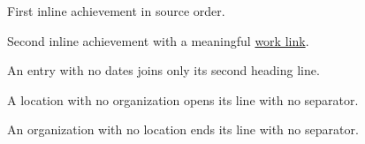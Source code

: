 \documentclass[entrymeta=inline]{careerdossier-resume}
\begin{document}
\MakeCDossierHeader
{}
\begin{CDossierEntry}[
  title={Engineer},
  organization={Example Labs},
  location={Toronto},
  dates={2024--2026}
]
\begin{CDossierItemize}
  \item First inline achievement in source order.
  \item Second inline achievement with a meaningful
        \href{https://example.test/work}{work link}.
\end{CDossierItemize}
\end{CDossierEntry}
\begin{CDossierEntry}[
  title={Dateless Engineer},
  organization={Example Services},
  location={Ottawa}
]
\begin{CDossierItemize}
  \item An entry with no dates joins only its second heading line.
\end{CDossierItemize}
\end{CDossierEntry}
\begin{CDossierEntry}[
  title={Volunteer Reviewer},
  location={Remote}
]
\begin{CDossierItemize}
  \item A location with no organization opens its line with no separator.
\end{CDossierItemize}
\end{CDossierEntry}
\begin{CDossierEntry}[
  title={Workshop Facilitator},
  organization={Example Trust}
]
\begin{CDossierItemize}
  \item An organization with no location ends its line with no separator.
\end{CDossierItemize}
\end{CDossierEntry}
\end{document}

